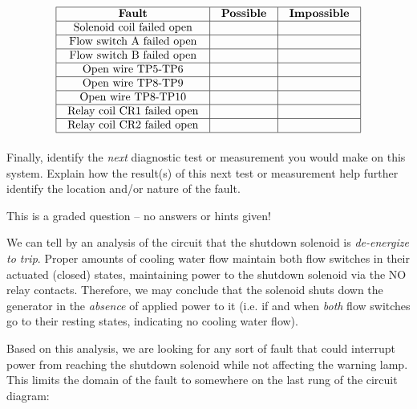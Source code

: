 
$$\vbox{\offinterlineskip
\halign{\strut
\vrule \quad\hfil # \ \hfil & 
\vrule \quad\hfil # \ \hfil & 
\vrule \quad\hfil # \ \hfil \vrule \cr
\noalign{\hrule}
%
{\bf Fault} & {\bf Possible} & {\bf Impossible} \cr
%
\noalign{\hrule}
%
Solenoid coil failed open &  &  \cr
%
\noalign{\hrule}
%
Flow switch A failed open &  &  \cr
%
\noalign{\hrule}
%
Flow switch B failed open &  &  \cr
%
\noalign{\hrule}
%
Open wire TP5-TP6 &  &  \cr
%
\noalign{\hrule}
%
Open wire TP8-TP9 &  &  \cr
%
\noalign{\hrule}
%
Open wire TP8-TP10 &  &  \cr
%
\noalign{\hrule}
%
Relay coil CR1 failed open &  &  \cr
%
\noalign{\hrule}
%
Relay coil CR2 failed open &  &  \cr
%
\noalign{\hrule}
} %
}$$ %

Finally, identify the {\it next} diagnostic test or measurement you would make on this system.  Explain how the result(s) of this next test or measurement help further identify the location and/or nature of the fault.

\vfil 

\eject






This is a graded question -- no answers or hints given!







We can tell by an analysis of the circuit that the shutdown solenoid is {\it de-energize to trip}.  Proper amounts of cooling water flow maintain both flow switches in their actuated (closed) states, maintaining power to the shutdown solenoid via the NO relay contacts.  Therefore, we may conclude that the solenoid shuts down the generator in the {\it absence} of applied power to it (i.e. if and when {\it both} flow switches go to their resting states, indicating no cooling water flow).

\vskip 10pt

Based on this analysis, we are looking for any sort of fault that could interrupt power from reaching the shutdown solenoid while not affecting the warning lamp.  This limits the domain of the fault to somewhere on the last rung of the circuit diagram:


